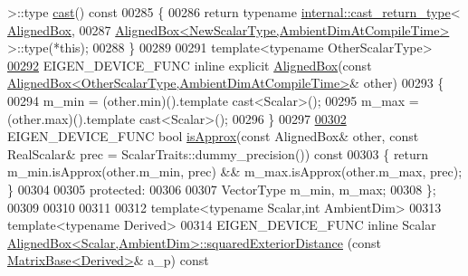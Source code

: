 \begin{DoxyCode}
       >::type \hyperlink{group___geometry___module_a269eb719d3e093d9c1cb4309b815c51b}{cast}()\textcolor{keyword}{ const}
00285 \textcolor{keyword}{  }\{
00286     \textcolor{keywordflow}{return} \textcolor{keyword}{typename} \hyperlink{struct_eigen_1_1internal_1_1cast__return__type}{internal::cast\_return\_type}<
      \hyperlink{group___geometry___module_aeb7682d3d8676752e9b789b51d950872}{AlignedBox},
00287                     \hyperlink{group___geometry___module_class_eigen_1_1_aligned_box}{AlignedBox<NewScalarType,AmbientDimAtCompileTime>}
       >::type(*\textcolor{keyword}{this});
00288   \}
00289 
00291   \textcolor{keyword}{template}<\textcolor{keyword}{typename} OtherScalarType>
\hyperlink{group___geometry___module_afa9f0963fda762e5ca3633caec7bf8f2}{00292}   EIGEN\_DEVICE\_FUNC \textcolor{keyword}{inline} \textcolor{keyword}{explicit} \hyperlink{group___geometry___module_afa9f0963fda762e5ca3633caec7bf8f2}{AlignedBox}(\textcolor{keyword}{const} 
      \hyperlink{group___geometry___module_class_eigen_1_1_aligned_box}{AlignedBox<OtherScalarType,AmbientDimAtCompileTime>}& 
      other)
00293   \{
00294     m\_min = (other.min)().template cast<Scalar>();
00295     m\_max = (other.max)().template cast<Scalar>();
00296   \}
00297 
\hyperlink{group___geometry___module_a9d21b1102d3b6944a80a563d3974c83c}{00302}   EIGEN\_DEVICE\_FUNC \textcolor{keywordtype}{bool} \hyperlink{group___geometry___module_a9d21b1102d3b6944a80a563d3974c83c}{isApprox}(\textcolor{keyword}{const} AlignedBox& other, \textcolor{keyword}{const} RealScalar& prec = 
      ScalarTraits::dummy\_precision())\textcolor{keyword}{ const}
00303 \textcolor{keyword}{  }\{ \textcolor{keywordflow}{return} m\_min.isApprox(other.m\_min, prec) && m\_max.isApprox(other.m\_max, prec); \}
00304 
00305 \textcolor{keyword}{protected}:
00306 
00307   VectorType m\_min, m\_max;
00308 \};
00309 
00310 
00311 
00312 \textcolor{keyword}{template}<\textcolor{keyword}{typename} Scalar,\textcolor{keywordtype}{int} AmbientDim>
00313 \textcolor{keyword}{template}<\textcolor{keyword}{typename} Derived>
00314 EIGEN\_DEVICE\_FUNC \textcolor{keyword}{inline} Scalar 
      \hyperlink{group___geometry___module_aa6d9ffc81bd77da631fef6559f45cf13}{AlignedBox<Scalar,AmbientDim>::squaredExteriorDistance}
      (\textcolor{keyword}{const} \hyperlink{group___core___module_class_eigen_1_1_matrix_base}{MatrixBase<Derived>}& a\_p)\textcolor{keyword}{ const}

\end{DoxyCode}
